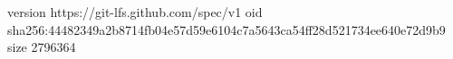 version https://git-lfs.github.com/spec/v1
oid sha256:44482349a2b8714fb04e57d59e6104c7a5643ca54ff28d521734ee640e72d9b9
size 2796364

